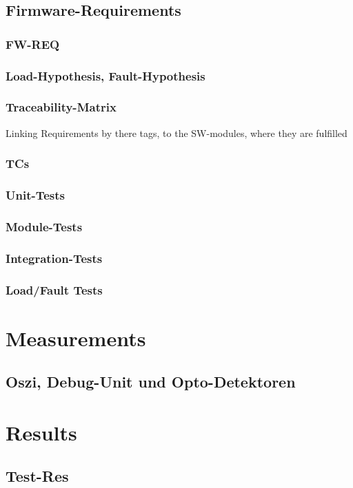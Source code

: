 \documentclass[master,english,smartquotes,apa]{hgbthesis}
\begin{document}
		\section{Firmware-Requirements}
			\subsection{FW-REQ}
			\subsection{Load-Hypothesis, Fault-Hypothesis}
			\subsection{Traceability-Matrix}
			Linking Requirements by there tags, to the SW-modules, where they are fulfilled
			\subsection{TCs}
			\subsection{Unit-Tests}
			\subsection{Module-Tests}
			\subsection{Integration-Tests}
			\subsection{Load/Fault Tests}
			
		
	\chapter{Measurements}
		\section{Oszi, Debug-Unit und Opto-Detektoren}

	\chapter{Results}
	\label{cha:Results}
		\section{Test-Res}
\end{document}
